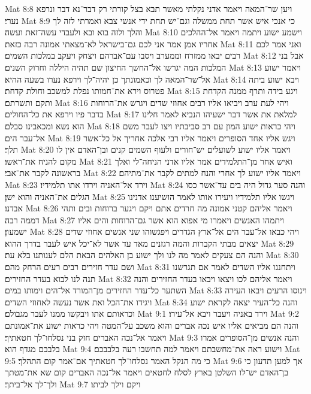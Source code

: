Mat 8:8  ויען שר־המאה ויאמר אדני נקלתי מאשר תבא בצל קורתי רק דבר־נא דבר ונרפא נערי׃
Mat 8:9  כי אנכי איש אשר תחת ממשלה וגם־יש תחת ידי אנשי צבא ואמרתי לזה לך והלך ולזה בוא ובא ולעבדי עשה־זאת ועשה׃
Mat 8:10  וישמע ישוע ויתמה ויאמר אל־ההלכים אחריו אמן אמר אני לכם גם־בישראל לא־מצאתי אמונה רבה כזאת׃
Mat 8:11  ואני אמר לכם רבים יבאו ממזרח וממערב ויסבו עם־אברהם ויצחק ויעקב במלכות השמים׃
Mat 8:12  אבל בני המלכות המה יגרשו אל־החשך החיצון שם תהיה היללה וחרוק השנים׃
Mat 8:13  ויאמר ישוע אל־שר־המאה לך וכאמונתך כן יהיה־לך וירפא נערו בשעה ההיא׃
Mat 8:14  ויבא ישוע ביתה פטרוס וירא את־חמותו נפלת למשכב וחולת קדחת׃
Mat 8:15  ויגע בידה ותרף ממנה הקדחת ותקם ותשרתם׃
Mat 8:16  ויהי לעת ערב ויביאו אליו רבים אחוזי שדים ויגרש את־הרוחות בדבר פיו וירפא את כל־החולים׃
Mat 8:17  למלאת את אשר דבר ישעיהו הנביא לאמר חלינו הוא נשא ומכאבינו סבלם׃
Mat 8:18  ויהי כראות ישוע המון עם רב סביבתיו ויצו לעבר משם אל־עבר הים׃
Mat 8:19  ויגש אליו אחד הסופרים ויאמר אליו רבי אלכה אחריך אל כל־אשר תלך׃
Mat 8:20  ויאמר אליו ישוע לשועלים יש־חורים ולעוף השמים קנים ובן־האדם אין לו מקום להניח את־ראשו׃
Mat 8:21  ואיש אחר מן־התלמידים אמר אליו אדני הניחה־לי ואלך בראשונה לקבר את־אבי׃
Mat 8:22  ויאמר אליו ישוע לך אחרי והנח למתים לקבר את־מתיהם׃
Mat 8:23  וירד אל־האניה וירדו אתו תלמידיו׃
Mat 8:24  והנה סער גדול היה בים עד־אשר כסו הגלים את־האניה והוא ישן׃
Mat 8:25  ויגשו אליו תלמידיו ויעירו אותו לאמר הושיענו אדנינו אבדנו׃
Mat 8:26  ויאמר אליהם קטני אמונה מה חרדים אתם ויקם ויגער ברוחות ובים ותהי דממה רבה׃
Mat 8:27  ויתמהו האנשים ויאמרו מי אפוא הוא אשר גם־הרוחות והים אליו ישמעון׃
Mat 8:28  ויהי כבאו אל־עבר הים אל־ארץ הגדרים ויפגשוהו שני אנשים אחוזי שדים יצאים מבתי הקברות והמה רגזנים מאד עד אשר לא־יכל איש לעבר בדרך ההוא׃
Mat 8:29  והנה הם צעקים לאמר מה לנו ולך ישוע בן האלהים הבאת הלם לענותנו בלא עת׃
Mat 8:30  ושם עדר חזירים רבים רעים הרחק מהם׃
Mat 8:31  ויתחננו אליו השדים לאמר אם תגרשנו תנה לנו לבוא בעדר החזירים׃
Mat 8:32  ויאמר אליהם לכו ויצאו ויבאו בעדר החזירים והנה השתער כל־עדר החזירים מן־המורד אל־הים וימותו במים׃
Mat 8:33  וינוסו הרעים ויבאו העירה ויגידו את־הכל ואת אשר נעשה לאחוזי השדים׃
Mat 8:34  והנה כל־העיר יצאה לקראת ישוע וכראותם אתו ויבקשו ממנו לעבר מגבולם׃
Mat 9:1  וירד באניה ויעבר ויבא אל־עירו׃
Mat 9:2  והנה הם מביאים אליו איש נכה אברים והוא משכב על־המטה ויהי כראות ישוע את־אמונתם ויאמר אל־נכה האברים חזק בני נסלחו־לך חטאתיך׃
Mat 9:3  והנה אנשים מן־הסופרים אמרו בלבבם מגדף הוא׃
Mat 9:4  וישוע ראה את־מחשבתם ויאמר למה תחשבו רעה בלבבכם׃
Mat 9:5  כי מה הנקל האמר נסלחו־לך חטאתיך אם־אמר קום התהלך׃
Mat 9:6  אך למען תדעון כי בן־האדם יש־לו השלטן בארץ לסלח לחטאים ויאמר אל־נכה האברים קום שא את־מטתך ולך־לך אל־ביתך׃
Mat 9:7  ויקם וילך לביתו׃
